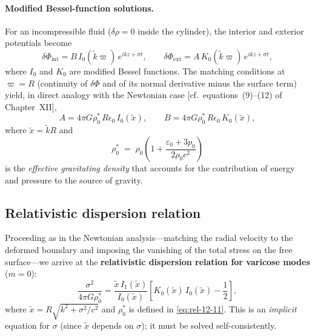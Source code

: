 \paragraph{Modified Bessel-function solutions.}
For an incompressible fluid ($\delta\rho = 0$ inside the cylinder), the
interior and exterior potentials become
\begin{equation}
\label{eq:rel-12-9}
\delta\Phi_{\mathrm{int}} = B\, I_{0}(\tilde{k}\varpi)\,e^{ikz+\sigma t},
\qquad
\delta\Phi_{\mathrm{ext}} = A\, K_{0}(\tilde{k}\varpi)\,e^{ikz+\sigma t},
\end{equation}
where $I_{0}$ and $K_{0}$ are modified Bessel functions.  The matching
conditions at $\varpi=R$ (continuity of $\delta\Phi$ and of its normal
derivative minus the surface term) yield, in direct analogy with the
Newtonian case [cf.\ equations~(9)--(12) of Chapter~XII],
\begin{equation}
\label{eq:rel-12-10}
A = 4\pi G\rho_{0}^{*}\,R\epsilon_{0}\,I_{0}(\tilde{x}),
\qquad
B = 4\pi G\rho_{0}^{*}\,R\epsilon_{0}\,K_{0}(\tilde{x}),
\end{equation}
where $\tilde{x}=\tilde{k}R$ and
\begin{equation}
\label{eq:rel-12-11}
\rho_{0}^{*} \;=\; \rho_{0}\!\left(1 + \frac{\varepsilon_{0}+3p_{0}}{2\rho_{0}c^{2}}\right)
\end{equation}
is the \emph{effective gravitating density} that accounts for the
contribution of energy and pressure to the source of gravity.

\subsection{Relativistic dispersion relation}
\label{sec:rel-12-108c}

Proceeding as in the Newtonian analysis---matching the radial velocity
to the deformed boundary and imposing the vanishing of the total stress
on the free surface---we arrive at the \textbf{relativistic dispersion
relation for varicose modes} ($m=0$):
\begin{equation}
\label{eq:rel-12-12}
\boxed{
\frac{\sigma^{2}}{4\pi G\rho_{0}^{*}}
  = \frac{\tilde{x}\,I_{1}(\tilde{x})}{I_{0}(\tilde{x})}
  \left[K_{0}(\tilde{x})\,I_{0}(\tilde{x}) - \frac{1}{2}\right],}
\end{equation}
where $\tilde{x} = R\sqrt{k^{2}+\sigma^{2}/c^{2}}$ and $\rho_{0}^{*}$
is defined in \eqref{eq:rel-12-11}.  This is an \emph{implicit}
equation for $\sigma$ (since $\tilde{x}$ depends on $\sigma$); it must
be solved self-consistently.

